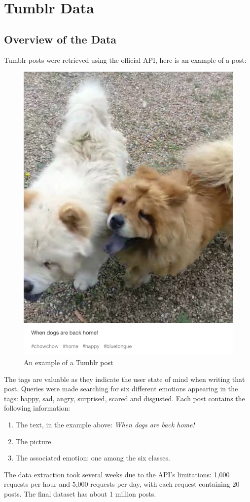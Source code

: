 \chapter{Tumblr Data}

\section{Overview of the Data}
Tumblr posts were retrieved using the official API, here is an example of a post:
\begin{figure}[H]
\centering
\includegraphics[width=.58\textwidth]{Images/chowchow.png}
\caption{An example of a Tumblr post}
\end{figure}

The tags are valuable as they indicate the user state of mind when writing that post. Queries were made searching for six different emotions appearing in the tags: happy, sad, angry, surprised, scared and disgusted. Each post contains the following information:
\begin{enumerate}
\item The text, in the example above: \textit{When dogs are back home!}
\item The picture.
\item The associated emotion: one among the six classes.
\end{enumerate}

The data extraction took several weeks due to the API's limitations: 1,000 requests per hour and 5,000 requests per day, with each request containing 20 posts. The final dataset has about 1 million posts.


